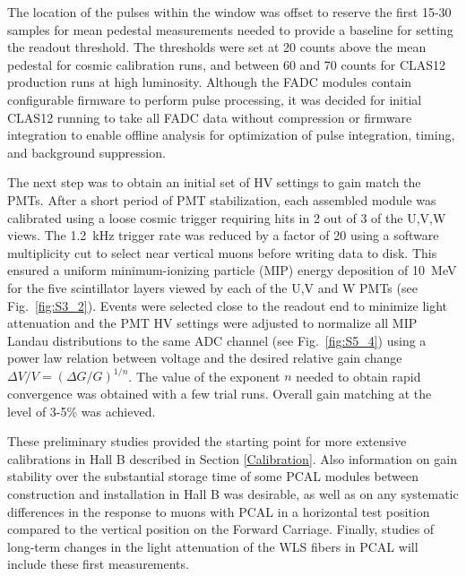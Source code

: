 The location of the pulses within the window was offset to reserve the first 15-30 samples for mean pedestal
measurements needed to provide a baseline for setting the readout threshold. The thresholds were set at 20
counts above the mean pedestal for cosmic calibration runs, and between 60 and 70 counts for CLAS12 production
runs at high luminosity. Although the FADC modules contain configurable firmware to perform pulse processing, it
was decided for initial CLAS12 running to take all FADC data without compression or firmware integration to
enable offline analysis for optimization of pulse integration, timing, and background suppression.

The next step was to obtain an initial set of HV settings to gain match the PMTs. After a short period of PMT
stabilization, each assembled module was calibrated using a loose cosmic trigger requiring hits in 2 out of 3 of
the U,V,W views. The 1.2~kHz trigger rate was reduced by a factor of 20 using a software multiplicity cut to
select near vertical muons before writing data to disk. This ensured a uniform minimum-ionizing particle (MIP)
energy deposition of 10~MeV for the five scintillator layers viewed by each of the U,V and W PMTs (see
Fig.~\ref{fig:S3_2}). Events were selected close to the readout end to minimize light attenuation and the PMT
HV settings were adjusted to normalize all MIP Landau distributions to the same ADC channel (see
Fig.~\ref{fig:S5_4}) using a power law relation between voltage and the desired relative gain change
$\Delta V/V = (\Delta G/G)^{1/n}$. The value of the exponent $n$ needed to obtain rapid convergence was
obtained with a few trial runs. Overall gain matching at the level of 3-5\% was achieved.

These preliminary studies provided the starting point for more extensive calibrations in Hall B described in
Section \ref{Calibration}. Also information on gain stability over the substantial storage time of some PCAL
modules between construction and installation in Hall B was desirable, as well as on any systematic differences in
the response to muons with PCAL in a horizontal test position compared to the vertical position on the Forward
Carriage. Finally, studies of long-term changes in the light attenuation of the WLS fibers in PCAL will include these
first measurements.



